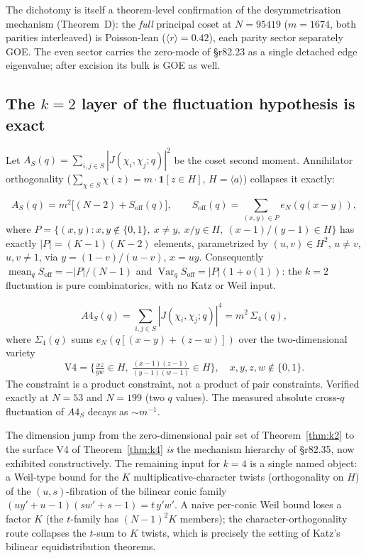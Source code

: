 The dichotomy is itself a theorem-level confirmation of the
desymmetrisation mechanism (Theorem~D): the \emph{full} principal coset at
$N = 95419$ ($m = 1674$, both parities interleaved) is Poisson-lean
($\langle r\rangle = 0.42$), each parity sector separately GOE.  The
even sector carries the zero-mode of \S r82.23 as a single detached edge
eigenvalue; after excision its bulk is GOE as well.

\subsection{The $k=2$ layer of the fluctuation hypothesis is exact}
\label{sec:k2exact}

Let $A_S(q) = \sum_{i,j \in S} |J(\chi_i,\chi_j;q)|^2$ be the coset second
moment.  Annihilator orthogonality
($\sum_{\chi \in S} \chi(z) = m \cdot \mathbf{1}[z \in H]$,
$H = \langle a\rangle$) collapses it exactly:

\begin{theorem}[$k=2$ combinatorial reduction; R92.1, PROVEN]
\label{thm:k2}
\[
  A_S(q) = m^2\big[(N{-}2) + S_{\mathrm{off}}(q)\big],
  \qquad
  S_{\mathrm{off}}(q) = \sum_{(x,y) \in P} e_N(q(x-y)),
\]
where
$P = \{(x,y) : x,y \notin \{0,1\},\ x \ne y,\ x/y \in H,\ (x{-}1)/(y{-}1) \in H\}$
has exactly $|P| = (K{-}1)(K{-}2)$ elements, parametrized by
$(u,v) \in H^2$, $u \ne v$, $u,v \ne 1$, via
$y = (1{-}v)/(u{-}v)$, $x = uy$.  Consequently
$\operatorname{mean}_q S_{\mathrm{off}} = -|P|/(N{-}1)$ and
$\operatorname{Var}_q S_{\mathrm{off}} = |P|(1 + o(1))$: the $k{=}2$
fluctuation is pure combinatorics, with no Katz or Weil input.
\end{theorem}

\begin{theorem}[$k=4$ factorization; R92.2, PROVEN]
\label{thm:k4}
\[
  A4_S(q) = \sum_{i,j \in S} |J(\chi_i,\chi_j;q)|^4 = m^2\,\Sigma_4(q),
\]
where $\Sigma_4(q)$ sums $e_N(q[(x{-}y){+}(z{-}w)])$ over the
two-dimensional variety
\[
  \mathrm{V4} = \Big\{ \tfrac{xz}{yw} \in H,\
  \tfrac{(x-1)(z-1)}{(y-1)(w-1)} \in H \Big\}, \quad x,y,z,w \notin \{0,1\}.
\]
The constraint is a product constraint, not a product of pair constraints.
Verified exactly at $N = 53$ and $N = 199$ (two $q$ values).  The measured
absolute cross-$q$ fluctuation of $A4_S$ decays as $\sim m^{-1}$.
\end{theorem}

The dimension jump from the zero-dimensional pair set of
Theorem~\ref{thm:k2} to the surface $\mathrm{V4}$ of
Theorem~\ref{thm:k4} \emph{is} the mechanism hierarchy of \S r82.35, now
exhibited constructively.  The remaining input for $k = 4$ is a single
named object: a Weil-type bound for the $K$ multiplicative-character
twists (orthogonality on $H$) of the $(u,s)$-fibration of the bilinear
conic family $(uy' + u - 1)(sw' + s - 1) = t\,y'w'$.  A naive per-conic
Weil bound loses a factor $K$ (the $t$-family has $(N{-}1)^2 K$ members);
the character-orthogonality route collapses the $t$-sum to $K$ twists,
which is precisely the setting of Katz's bilinear equidistribution
theorems.

